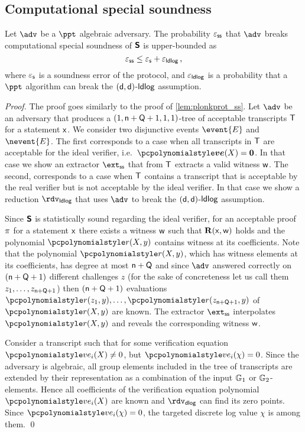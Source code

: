 \documentclass[runningheads,11pt]{llncs}
\let\spvec\vec
\let\vec\accentvec
\let\spvec\vec
\let\vec\spvec
\def\vec#1{\mathchoice{\mbox{\boldmath$\displaystyle#1$}}
  {\mbox{\boldmath$\textstyle#1$}} {\mbox{\boldmath$\scriptstyle#1$}}
  {\mbox{\boldmath$\scriptscriptstyle#1$}}}
\begin{document}
\subsection{Computational special soundness}
\begin{lemma}
	\label{lem:sonicprot_ss}
	Let $\adv$ be a $\ppt$ algebraic adversary. The probability $\varepsilon_{\mathsf{ss}}$ that
  $\adv$ breaks computational special soundness of $\bm{\mathsf{S}}$ is upper-bounded
  as
	\[
			\varepsilon_{\mathsf{ss}} \leq \varepsilon_{\mathsf{s}} + \varepsilon_{\mathsf{ldlog}}\,,
	\]
	where $\varepsilon_{\mathsf{s}}$ is a soundness error of the protocol, and $\varepsilon_{\mathsf{ldlog}}$ is a
  probability that a $\ppt$ algorithm can break the $(\mathsf{d},
  \mathsf{d})$-$\mathsf{ldlog}$ assumption.
\end{lemma}
\begin{proof}
  The proof goes similarly to the proof of \cref{lem:plonkprot_ss}.
%
  Let $\adv$ be an adversary that produces a
  $(1, \mathsf{n} + \mathsf{Q} + 1, 1, 1)$-tree of acceptable transcripts
  $\mathsf{T}$ for a statement $\mathsf{x}$. We consider two disjunctive events $\event{E}$
  and $\nevent{E}$. The first corresponds to a case when all transcripts in
  $\mathsf{T}$ are acceptable for the ideal verifier,
  i.e.~$\vec{\vereq}(X) = \vec{0}$. In that case we show an extractor $\extss$
  that from $\mathsf{T}$ extracts a valid witness $\mathsf{w}$. The second, corresponds to
  a case when $\mathsf{T}$ contains a transcript that is acceptable by the real
  verifier but is not acceptable by the ideal verifier.  In that case we show a
  reduction $\rdvldlog$ that uses $\adv$ to break the
  $(\mathsf{d}, \mathsf{d})$-$\mathsf{ldlog}$ assumption.

   Since $\bm{\mathsf{S}}$ is statistically sound
  regarding the ideal verifier, for an acceptable proof $\pi$ for a
  statement $\mathsf{x}$ there exists a witness $\mathsf{w}$ such that $\mathbf{R}(\mathsf{x}, \mathsf{w})$
  holds and the polynomial $\p{r}(X, y)$ contains witness at its coefficients.
  Note that the polynomial $\p{r}(X, y)$, which has witness elements at its
  coefficients, has degree at most $\mathsf{n} + \mathsf{Q}$ and since $\adv$
  answered correctly on $(\mathsf{n} + \mathsf{Q} + 1)$ different challenges
  $z$ (for the sake of concreteness let us call them
  $z_1, \ldots, z_{\mathsf{n} + \mathsf{Q} + 1}$) then
  $(\mathsf{n} + \mathsf{Q} + 1)$ evaluations
  $\p{r}(z_1, y), \ldots, \p{r}(z_{\multconstr + \linconstr + 1}, y)$ of
  $\p{r}(X, y)$ are known. The extractor $\extss$ interpolates $\p{r}(X, y)$ and
  reveals the corresponding witness $\mathsf{w}$.

   Consider a transcript such that for some
  verification equation $\vereq_i(X) \neq 0$, but $\vereq_i(\chi) = 0$. Since
  the adversary is algebraic, all group elements included in the tree of
  transcripts are extended by their representation as a combination of the input
  $\mathbb{G}_1$ or $\mathbb{G}_2$-elements. Hence all coefficients of the verification
  equation polynomial $\vereq_i(X)$ are known and $\rdvdlog$ can find its zero
  points. Since $\vereq_i(\chi) = 0$, the targeted discrete log value $\chi$ is
  among them. \qed
\end{proof}
\end{document}
